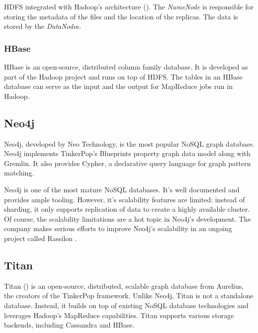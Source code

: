 HDFS integrated with Hadoop's architecture (). The \emph{NameNode} is responsible for storing the metadata of the files and the location of the replicas. The data is stored by the \emph{DataNode}s.


\subsubsection{HBase}

HBase is an open-source, distributed column family database. It is developed as part of the Hadoop project and runs on top of HDFS. The tables in an HBase database can serve as the input and the output for MapReduce jobs run in Hadoop.

\subsection{Neo4j}

Neo4j, developed by Neo Technology, is the most popular NoSQL graph database. Neo4j implements TinkerPop's Blueprints property graph data model along with Gremlin. It also provides Cypher, a declarative query language for graph pattern matching. 

Neo4j is one of the most mature NoSQL databases. It's well documented and provides ample tooling. However, it's scalability features are limited: instead of sharding, it only supports replication of data to create a highly available cluster. Of course, the scalability limitations are a hot topic in Neo4j's development. The company makes serious efforts to improve Neo4j's scalability in an ongoing project called Rassilon \cite{rassilon}.


\subsection{Titan}

Titan () is an open-source, distributed, scalable graph database from Aurelius, the creators of the TinkerPop framework. Unlike Neo4j, Titan is not a standalone database. Instead, it builds on top of existing NoSQL database technologies and leverages Hadoop's MapReduce capabilities. Titan supports various storage backends, including Cassandra and HBase.


